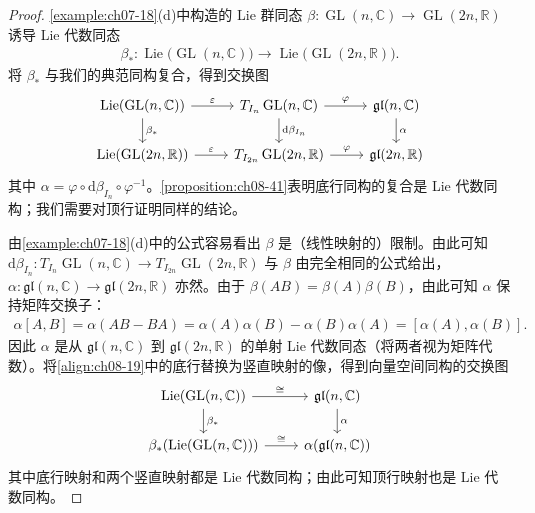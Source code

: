 \documentclass[../../main.tex]{subfiles}
\begin{document}
\begin{proof}
\cref{example:ch07-18}(d)中构造的 Lie 群同态 $\beta\colon\operatorname{GL}(n,\mathbb{C})\to\operatorname{GL}(2n,\mathbb{R})$ 诱导 Lie 代数同态
\begin{align*}
\beta_*\colon\operatorname{Lie}\bigl(\operatorname{GL}(n,\mathbb{C})\bigr)\to\operatorname{Lie}\bigl(\operatorname{GL}(2n,\mathbb{R})\bigr).
\end{align*}
将 $\beta_*$ 与我们的典范同构复合，得到交换图
\begin{align*}
\begin{tikzcd}[ampersand replacement=\&]
\operatorname{Lie}(\operatorname{GL}(n,\mathbb{C})) \ar{r}{\varepsilon} \ar{d}{\beta_*} \& T_{I_n}\operatorname{GL}(n,\mathbb{C}) \ar{r}{\varphi} \ar{d}{\mathrm{d}\beta_{I_n}} \& \mathfrak{gl}(n,\mathbb{C}) \ar{d}{\alpha}\\
\operatorname{Lie}(\operatorname{GL}(2n,\mathbb{R})) \ar{r}{\varepsilon} \& T_{I_{2n}}\operatorname{GL}(2n,\mathbb{R}) \ar{r}{\varphi} \& \mathfrak{gl}(2n,\mathbb{R})
\end{tikzcd}
\end{align*}
其中 $\alpha=\varphi\circ\mathrm{d}\beta_{I_n}\circ\varphi^{-1}$。\cref{proposition:ch08-41}表明底行同构的复合是 Lie 代数同构；我们需要对顶行证明同样的结论。

由\cref{example:ch07-18}(d)中的公式容易看出 $\beta$ 是（线性映射的）限制。由此可知 $\mathrm{d}\beta_{I_n}\colon T_{I_n}\operatorname{GL}(n,\mathbb{C})\to T_{I_{2n}}\operatorname{GL}(2n,\mathbb{R})$ 与 $\beta$ 由完全相同的公式给出，$\alpha\colon\mathfrak{gl}(n,\mathbb{C})\to\mathfrak{gl}(2n,\mathbb{R})$ 亦然。由于 $\beta(AB)=\beta(A)\beta(B)$，由此可知 $\alpha$ 保持矩阵交换子：
\begin{align*}
\alpha[A,B]=\alpha(AB-BA)=\alpha(A)\alpha(B)-\alpha(B)\alpha(A)=[\alpha(A),\alpha(B)].
\end{align*}
因此 $\alpha$ 是从 $\mathfrak{gl}(n,\mathbb{C})$ 到 $\mathfrak{gl}(2n,\mathbb{R})$ 的单射 Lie 代数同态（将两者视为矩阵代数）。将\eqref{align:ch08-19}中的底行替换为竖直映射的像，得到向量空间同构的交换图
\begin{align*}
\begin{tikzcd}[ampersand replacement=\&]
\operatorname{Lie}(\operatorname{GL}(n,\mathbb{C})) \ar{r}{\cong} \ar{d}{\beta_*} \& \mathfrak{gl}(n,\mathbb{C}) \ar{d}{\alpha}\\
\beta_*(\operatorname{Lie}(\operatorname{GL}(n,\mathbb{C}))) \ar{r}{\cong} \& \alpha(\mathfrak{gl}(n,\mathbb{C}))
\end{tikzcd}
\end{align*}
其中底行映射和两个竖直映射都是 Lie 代数同构；由此可知顶行映射也是 Lie 代数同构。
\end{proof}
\end{document}
